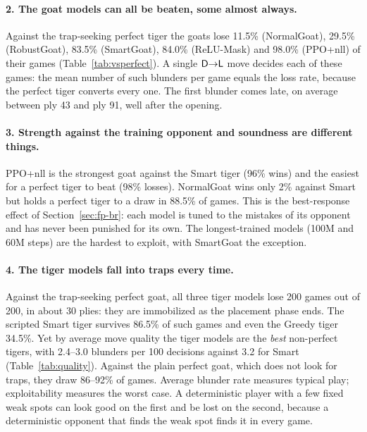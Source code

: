 \paragraph{2. The goat models can all be beaten, some almost always.} Against the trap-seeking perfect tiger
the goats lose 11.5\% (NormalGoat), 29.5\% (RobustGoat), 83.5\% (SmartGoat), 84.0\% (ReLU-Mask) and 98.0\%
(PPO+nll) of their games (Table~\ref{tab:vsperfect}). A single $\mathsf{D}{\to}\mathsf{L}$ move decides each of these games: the
mean number of such blunders per game equals the loss rate, because the perfect tiger converts every one.
The first blunder comes late, on average between ply 43 and ply 91, well after the opening.

\paragraph{3. Strength against the training opponent and soundness are different things.} PPO+nll is the
strongest goat against the Smart tiger (96\% wins) and the easiest for a perfect tiger to beat (98\% losses).
NormalGoat wins only 2\% against Smart but holds a perfect tiger to a draw in 88.5\% of games. This is the
best-response effect of Section~\ref{sec:fp-br}: each model is tuned to the mistakes of its opponent and has
never been punished for its own. The longest-trained models (100M and 60M steps) are the hardest to exploit,
with SmartGoat the exception.

\paragraph{4. The tiger models fall into traps every time.} Against the trap-seeking perfect goat, all three
tiger models lose 200 games out of 200, in about 30 plies: they are immobilized as the placement phase ends.
The scripted Smart tiger survives 86.5\% of such games and even the Greedy tiger 34.5\%. Yet by average move
quality the tiger models are the \emph{best} non-perfect tigers, with 2.4--3.0 blunders per 100 decisions
against 3.2 for Smart (Table~\ref{tab:quality}). Against the plain perfect goat, which does not look for traps,
they draw 86--92\% of games. Average blunder rate measures typical play; exploitability measures the worst
case. A deterministic player with a few fixed weak spots can look good on the first and be lost on the second,
because a deterministic opponent that finds the weak spot finds it in every game.

